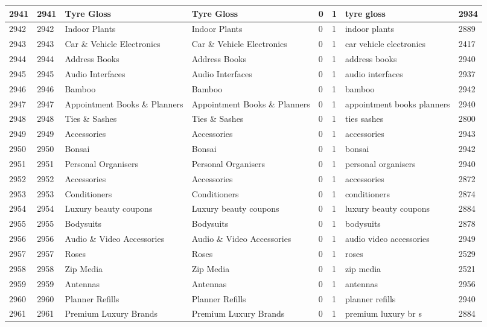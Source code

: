 \begin{longtable}{|l|l|l|l|l|l|l|l|}
2941 & 2941 & Tyre Gloss & Tyre Gloss & 0 & 1 & tyre gloss & 2934 \\ \hline 
2942 & 2942 & Indoor Plants & Indoor Plants & 0 & 1 & indoor plants & 2889 \\ \hline 
2943 & 2943 & Car \& Vehicle Electronics & Car \& Vehicle Electronics & 0 & 1 & car vehicle electronics & 2417 \\ \hline 
2944 & 2944 & Address Books & Address Books & 0 & 1 & address books & 2940 \\ \hline 
2945 & 2945 & Audio Interfaces & Audio Interfaces & 0 & 1 & audio interfaces & 2937 \\ \hline 
2946 & 2946 & Bamboo & Bamboo & 0 & 1 & bamboo & 2942 \\ \hline 
2947 & 2947 & Appointment Books \& Planners & Appointment Books \& Planners & 0 & 1 & appointment books planners & 2940 \\ \hline 
2948 & 2948 & Ties \& Sashes & Ties \& Sashes & 0 & 1 & ties sashes & 2800 \\ \hline 
2949 & 2949 & Accessories & Accessories & 0 & 1 & accessories & 2943 \\ \hline 
2950 & 2950 & Bonsai & Bonsai & 0 & 1 & bonsai & 2942 \\ \hline 
2951 & 2951 & Personal Organisers & Personal Organisers & 0 & 1 & personal organisers & 2940 \\ \hline 
2952 & 2952 & Accessories & Accessories & 0 & 1 & accessories & 2872 \\ \hline 
2953 & 2953 & Conditioners & Conditioners & 0 & 1 & conditioners & 2874 \\ \hline 
2954 & 2954 & Luxury beauty coupons & Luxury beauty coupons & 0 & 1 & luxury beauty coupons & 2884 \\ \hline 
2955 & 2955 & Bodysuits & Bodysuits & 0 & 1 & bodysuits & 2878 \\ \hline 
2956 & 2956 & Audio \& Video Accessories & Audio \& Video Accessories & 0 & 1 & audio video accessories & 2949 \\ \hline 
2957 & 2957 & Roses & Roses & 0 & 1 & roses & 2529 \\ \hline 
2958 & 2958 & Zip Media & Zip Media & 0 & 1 & zip media & 2521 \\ \hline 
2959 & 2959 & Antennas & Antennas & 0 & 1 & antennas & 2956 \\ \hline 
2960 & 2960 & Planner Refills & Planner Refills & 0 & 1 & planner refills & 2940 \\ \hline 
2961 & 2961 & Premium Luxury Brands & Premium Luxury Brands & 0 & 1 & premium luxury br s & 2884 \\ \hline 

\end{longtable}
